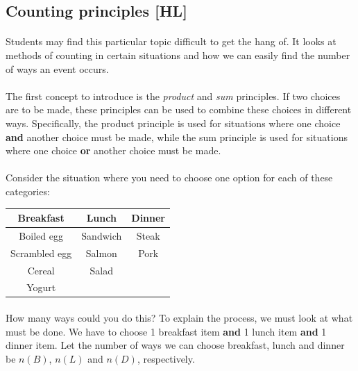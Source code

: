 \documentclass[12pt, a4paper, titlepage, twoside]{article}
\begin{document}
	\hfill
	
	\subsection{Counting principles [HL]}
	
	\paragraph{}
	Students may find this particular topic difficult to get the hang of. It looks at methods of counting in certain situations
	and how we can easily find the number of ways an event occurs.
	
	\paragraph{}
	The first concept to introduce is the \textit{product} and \textit{sum} principles. If two choices are to be made, 
	these principles can be used to combine these choices in different ways. Specifically, the product principle is used for
	situations where one choice \textbf{and} another choice must be made, while the sum principle is used for situations where
	one choice \textbf{or} another choice must be made.
	
	\paragraph{}
	Consider the situation where you need to choose one option for each of these categories:\newpage
	
	\begin{longtable}{|c|c|c|}
		\hline
		\textbf{Breakfast} & \textbf{Lunch} & \textbf{Dinner}\\
		\hline
		Boiled egg & Sandwich & Steak\\
		\hline
		Scrambled egg & Salmon & Pork\\
		\hline
		Cereal & Salad & \makecell{}\\
		\hline
		Yogurt & \makecell{} & \makecell{}\\
		\hline
	\end{longtable}
	
	\paragraph{}
	How many ways could you do this? To explain the process, we must look at what must be done.
	We have to choose 1 breakfast item \textbf{and} 1 lunch item \textbf{and} 1 dinner item.
	Let the number of ways we can choose breakfast, lunch and dinner be $n(B)$, $n(L)$ and $n(D)$, respectively.
	
\end{document}
